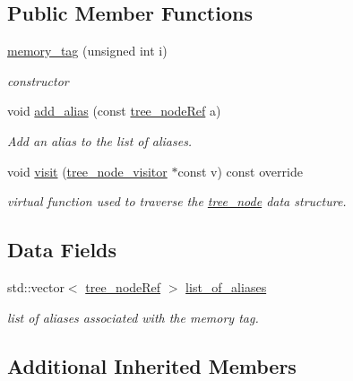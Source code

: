 \subsection*{Public Member Functions}
\begin{DoxyCompactItemize}
\item 
\hyperlink{structmemory__tag_a6c833828a5666a9f1a730f1c0dacfe75}{memory\+\_\+tag} (unsigned int i)
\begin{DoxyCompactList}\small\item\em constructor \end{DoxyCompactList}\item 
void \hyperlink{structmemory__tag_aafe5ae70017e9df36613842b67979c96}{add\+\_\+alias} (const \hyperlink{tree__node_8hpp_a6ee377554d1c4871ad66a337eaa67fd5}{tree\+\_\+node\+Ref} a)
\begin{DoxyCompactList}\small\item\em Add an alias to the list of aliases. \end{DoxyCompactList}\item 
void \hyperlink{structmemory__tag_a9dec2571221222773939c1629db2267b}{visit} (\hyperlink{classtree__node__visitor}{tree\+\_\+node\+\_\+visitor} $\ast$const v) const override
\begin{DoxyCompactList}\small\item\em virtual function used to traverse the \hyperlink{classtree__node}{tree\+\_\+node} data structure. \end{DoxyCompactList}\end{DoxyCompactItemize}
\subsection*{Data Fields}
\begin{DoxyCompactItemize}
\item 
std\+::vector$<$ \hyperlink{tree__node_8hpp_a6ee377554d1c4871ad66a337eaa67fd5}{tree\+\_\+node\+Ref} $>$ \hyperlink{structmemory__tag_a575a27d3f9bc790b687e8a26e2f5715d}{list\+\_\+of\+\_\+aliases}
\begin{DoxyCompactList}\small\item\em list of aliases associated with the memory tag. \end{DoxyCompactList}\end{DoxyCompactItemize}
\subsection*{Additional Inherited Members}


